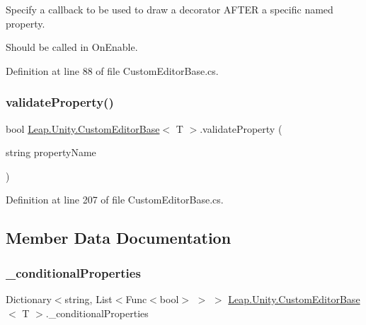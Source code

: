Specify a callback to be used to draw a decorator A\+F\+T\+ER a specific named property. 

Should be called in On\+Enable. 

Definition at line 88 of file Custom\+Editor\+Base.\+cs.

\mbox{\label{class_leap_1_1_unity_1_1_custom_editor_base_a1b822af17dba348a6230822cd0731e25}} 
\subsubsection{\texorpdfstring{validateProperty()}{validateProperty()}}
{\footnotesize\ttfamily bool \mbox{\hyperlink{class_leap_1_1_unity_1_1_custom_editor_base}{Leap.\+Unity.\+Custom\+Editor\+Base}}$<$ T $>$.validate\+Property (\begin{DoxyParamCaption}\item[{string}]{property\+Name }\end{DoxyParamCaption})\hspace{0.3cm}{\ttfamily [protected]}}



Definition at line 207 of file Custom\+Editor\+Base.\+cs.



\subsection{Member Data Documentation}
\mbox{\label{class_leap_1_1_unity_1_1_custom_editor_base_ab42eb97ce1b14432882b218251fb33b7}} 
\subsubsection{\texorpdfstring{\_conditionalProperties}{\_conditionalProperties}}
{\footnotesize\ttfamily Dictionary$<$string, List$<$Func$<$bool$>$ $>$ $>$ \mbox{\hyperlink{class_leap_1_1_unity_1_1_custom_editor_base}{Leap.\+Unity.\+Custom\+Editor\+Base}}$<$ T $>$.\+\_\+conditional\+Properties\hspace{0.3cm}{\ttfamily [protected]}}



